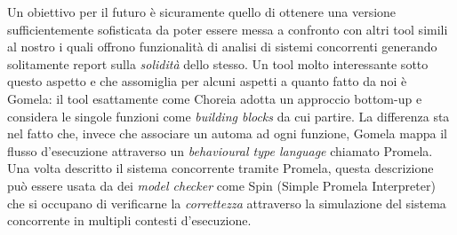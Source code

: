 Un obiettivo per il futuro è sicuramente quello di ottenere una versione sufficientemente sofisticata da poter essere messa a confronto con altri tool simili al nostro i quali offrono funzionalità di analisi di sistemi concorrenti generando solitamente report sulla \emph{solidità} dello stesso. Un tool molto interessante sotto questo aspetto e che assomiglia per alcuni aspetti a quanto fatto da noi è Gomela\cite{Gomela}: il tool esattamente come Choreia adotta un approccio bottom-up e considera le singole funzioni come \emph{building blocks} da cui partire. La differenza sta nel fatto che, invece che associare un automa ad ogni funzione, Gomela mappa il flusso d'esecuzione attraverso un \emph{behavioural type language} chiamato Promela\cite{Promela}. Una volta descritto il sistema concorrente tramite Promela, questa descrizione può essere usata da dei \emph{model checker} come Spin\cite{Spin} (Simple Promela Interpreter) che si occupano di verificarne la \emph{correttezza} attraverso la simulazione del sistema concorrente in multipli contesti d'esecuzione.